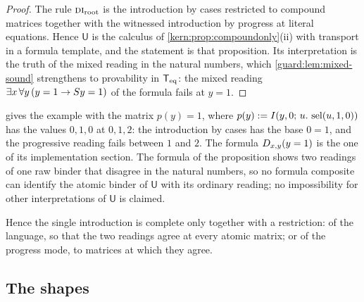 \begin{proof}
The rule $\rulename{DI}_{\mathrm{root}}$ is the introduction by cases
restricted to compound matrices together with the witnessed introduction by
progress at literal equations.  Hence $\mathsf U$ is the calculus of
\cref{kern:prop:compoundonly}(ii) with transport in a formula template, and
the statement is that proposition.  Its interpretation is the truth of the
mixed reading in the natural numbers, which \cref{guard:lem:mixed-sound}
strengthens to provability in $\mathsf{T}_{\mathrm{eq}}$: the mixed reading
$\exists x\,\forall y\,(y=1\to S y=1)$ of the formula fails at $y=1$.
\end{proof}

\begin{remark}
\label{guard:rem:strict-variants}
 gives the example with the matrix $p(y)=1$, where
$p(y)\mathrel{:=}I(y,0;\,u.\,\operatorname{sel}(u,1,0))$ has the values $0,1,0$ at $0,1,2$: the
introduction by cases has the base $0=1$, and the progressive reading fails
between $1$ and $2$.  The formula $D_{x,y}(y=1)$ is the one of its
implementation section.  The formula of the proposition shows two readings
of one raw binder that disagree in the natural numbers, so no formula
composite can identify the atomic binder of $\mathsf U$ with its ordinary
reading; no impossibility for other interpretations of $\mathsf U$ is
claimed.
\end{remark}

Hence the single introduction is complete only together with a restriction:
of the language, so that the two readings agree at every atomic matrix; or of
the progress mode, to matrices at which they agree.

\subsection{The shapes}

